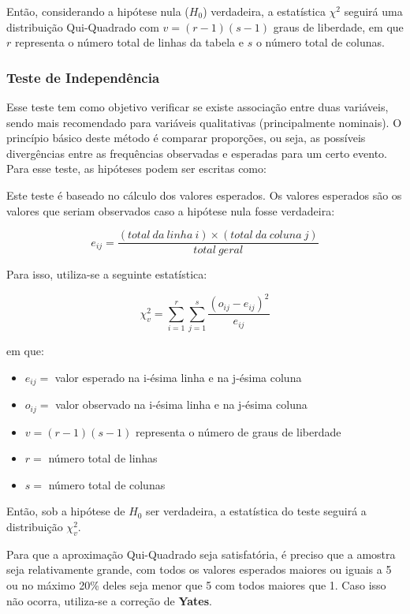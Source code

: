 \documentclass[
]{estat/estat}
\providecommand{\tightlist}{%
  \setlength{\itemsep}{0pt}\setlength{\parskip}{0pt}}\usepackage{longtable,booktabs,array}
\begin{document}
Então, considerando a hipótese nula (\(H_{0}\)) verdadeira, a
estatística \(\chi^{2}\) seguirá uma distribuição Qui-Quadrado com
\(v = (r - 1)(s - 1)\) graus de liberdade, em que \(r\) representa o
número total de linhas da tabela e \(s\) o número total de colunas.

\hypertarget{teste-de-independuxeancia}{%
\subsubsection{Teste de Independência}\label{teste-de-independuxeancia}}

Esse teste tem como objetivo verificar se existe associação entre duas
variáveis, sendo mais recomendado para variáveis qualitativas
(principalmente nominais). O princípio básico deste método é comparar
proporções, ou seja, as possíveis divergências entre as frequências
observadas e esperadas para um certo evento. Para esse teste, as
hipóteses podem ser escritas como:


Este teste é baseado no cálculo dos valores esperados. Os valores
esperados são os valores que seriam observados caso a hipótese nula
fosse verdadeira:

\[e_{ij} = \frac{(total\ da\ linha\ i) \times (total\ da\ coluna\ j)}{total\ geral} \]

Para isso, utiliza-se a seguinte estatística:

\[\chi_{v}^{2} = \displaystyle\sum_{i=1}^r \sum_{j=1}^s \frac{ {(o_{ij} - e_{ij})}^2}{e_{ij}}\]

em que:

\begin{itemize}
\tightlist
\item
  \(e_{ij}=\) valor esperado na i-ésima linha e na j-ésima coluna
\item
  \(o_{ij}=\) valor observado na i-ésima linha e na j-ésima coluna
\item
  \(v = (r - 1)(s - 1)\) representa o número de graus de liberdade
\item
  \(r=\) número total de linhas
\item
  \(s=\) número total de colunas
\end{itemize}

Então, sob a hipótese de \(H_{0}\) ser verdadeira, a estatística do
teste seguirá a distribuição \(\chi_{v}^{2}\).

Para que a aproximação Qui-Quadrado seja satisfatória, é preciso que a
amostra seja relativamente grande, com todos os valores esperados
maiores ou iguais a 5 ou no máximo 20\% deles seja menor que 5 com todos
maiores que 1. Caso isso não ocorra, utiliza-se a correção de
\textbf{Yates}.
\end{document}
